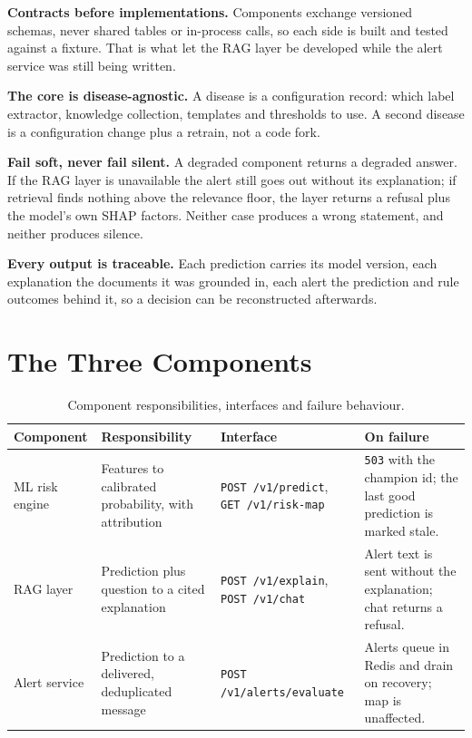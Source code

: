 \documentclass[10pt,openany]{report}
\begin{document}
\textbf{Contracts before implementations.} Components exchange versioned schemas, never shared tables
or in-process calls, so each side is built and tested against a fixture. That is what let the RAG
layer be developed while the alert service was still being written.

\textbf{The core is disease-agnostic.} A disease is a configuration record: which label extractor,
knowledge collection, templates and thresholds to use. A second disease is a configuration change plus
a retrain, not a code fork.

\textbf{Fail soft, never fail silent.} A degraded component returns a degraded answer. If the RAG
layer is unavailable the alert still goes out without its explanation; if retrieval finds nothing
above the relevance floor, the layer returns a refusal plus the model's own SHAP factors. Neither
case produces a wrong statement, and neither produces silence.

\textbf{Every output is traceable.} Each prediction carries its model version, each explanation the
documents it was grounded in, each alert the prediction and rule outcomes behind it, so a decision can
be reconstructed afterwards.

\section{The Three Components}

\begin{table}[htbp]
\centering
\caption{Component responsibilities, interfaces and failure behaviour.}
\label{tab:components}
\small
\begin{tabular}{@{}>{\raggedright\arraybackslash}p{2.2cm}>{\raggedright\arraybackslash}p{3.6cm}>{\raggedright\arraybackslash}p{3.4cm}>{\raggedright\arraybackslash}p{4.2cm}@{}}
\toprule
\textbf{Component} & \textbf{Responsibility} & \textbf{Interface} & \textbf{On failure} \\
\midrule
ML risk engine & Features to calibrated probability, with attribution & \texttt{POST /v1/predict}, \texttt{GET /v1/risk-map} & \texttt{503} with the champion id; the last good prediction is marked stale. \\
RAG layer & Prediction plus question to a cited explanation & \texttt{POST /v1/explain}, \texttt{POST /v1/chat} & Alert text is sent without the explanation; chat returns a refusal. \\
Alert service & Prediction to a delivered, deduplicated message & \texttt{POST /v1/alerts/evaluate} & Alerts queue in Redis and drain on recovery; map is unaffected. \\
\bottomrule
\end{tabular}
\end{table}
\end{document}
